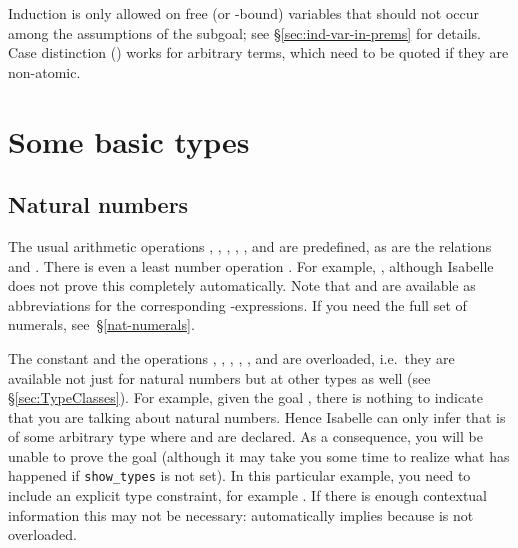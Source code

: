 \begin{exercise}\label{ex:Tree}
%
\end{exercise}



\begin{warn}
  Induction is only allowed on free (or \isasymAnd-bound) variables that
  should not occur among the assumptions of the subgoal; see
  \S\ref{sec:ind-var-in-prems} for details. Case distinction
  () works for arbitrary terms, which need to be
  quoted if they are non-atomic.
\end{warn}




\section{Some basic types}


\subsection{Natural numbers}
\label{sec:nat}




The usual arithmetic operations ,
, ,
, ,  and
 are predefined, as are the relations
 and
. There is even a least number operation
. For example, , although
Isabelle does not prove this completely automatically. Note that  and
 are available as abbreviations for the corresponding
-expressions. If you need the full set of numerals,
see~\S\ref{nat-numerals}.

\begin{warn}
  The constant  and the operations
  , ,
  , , ,
   and
   are overloaded, i.e.\ they are available
  not just for natural numbers but at other types as well (see
  \S\ref{sec:TypeClasses}). For example, given the goal , there
  is nothing to indicate that you are talking about natural numbers.  Hence
  Isabelle can only infer that  is of some arbitrary type where
   and \isa{+} are declared. As a consequence, you will be unable to
  prove the goal (although it may take you some time to realize what has
  happened if \texttt{show_types} is not set).  In this particular example,
  you need to include an explicit type constraint, for example .  If there is enough contextual information this may not be
  necessary:  automatically implies  because
   is not overloaded.
\end{warn}

